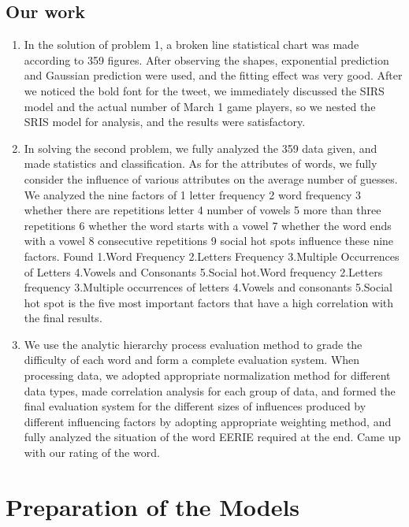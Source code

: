 \documentclass[12pt]{article}  %
\begin{document}
\subsection{Our work}


\begin{enumerate}[\bfseries 1.]
    \item In the solution of problem 1, a broken line statistical chart was made according to 359 figures. After observing the shapes, exponential prediction and Gaussian prediction were used, and the fitting effect was very good. After we noticed the bold font for the tweet, we immediately discussed the SIRS model and the actual number of March 1 game players, so we nested the SRIS model for analysis, and the results were satisfactory.
    \item In solving the second problem, we fully analyzed the 359 data given, and made statistics and classification. As for the attributes of words, we fully consider the influence of various attributes on the average number of guesses. We analyzed the nine factors of 1 letter frequency 2 word frequency 3 whether there are repetitions letter 4 number of vowels 5 more than three repetitions 6 whether the word starts with a vowel 7 whether the word ends with a vowel 8 consecutive repetitions 9 social hot spots influence these nine factors. Found 1.Word Frequency 2.Letters Frequency 3.Multiple Occurrences of Letters 4.Vowels and Consonants 5.Social hot.Word frequency 2.Letters frequency 3.Multiple occurrences of letters 4.Vowels and consonants 5.Social hot spot is the five most important factors that have a high correlation with the final results.
    
    \item We use the analytic hierarchy process evaluation method to grade the difficulty of each word and form a complete evaluation system. When processing data, we adopted appropriate normalization method for different data types, made correlation analysis for each group of data, and formed the final evaluation system for the different sizes of influences produced by different influencing factors by adopting appropriate weighting method, and fully analyzed the situation of the word EERIE required at the end. Came up with our rating of the word.
\end{enumerate}

\section{Preparation of the Models}
\end{document}
